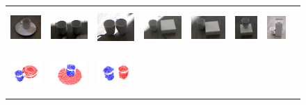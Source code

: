 \begin{figure}[h!]
\begin{tabular}{cccccccc}
    \includegraphics[height=1.5cm]{pictures/112.jpg}&
    \includegraphics[height=1.5cm]{pictures/122.jpg}&
    \includegraphics[height=1.5cm]{pictures/132.jpg}&
    \includegraphics[height=1.5cm]{pictures/142.jpg}&
    \includegraphics[height=1.5cm]{pictures/152.jpg}&
    \includegraphics[height=1.5cm]{pictures/162.jpg}&
    \includegraphics[height=1.5cm]{pictures/172.jpg}\\ \includegraphics[height=1.5cm]{pictures/103.png}&
    \includegraphics[height=1.5cm]{pictures/113.png}&
    \includegraphics[height=1.5cm]{pictures/123.png}&

\end{tabular}
\end{figure}
